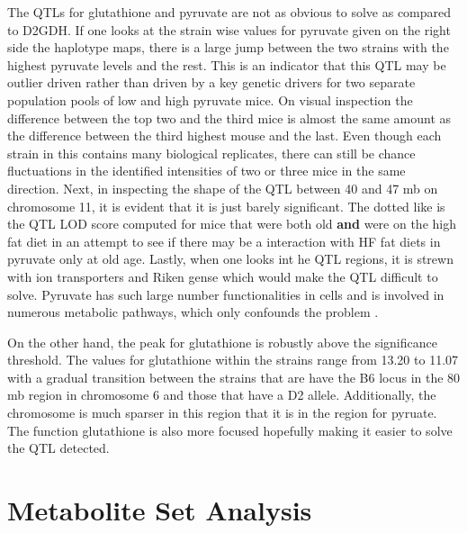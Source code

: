 \documentclass[a4paper]{book}
\begin{document}
	The QTLs for glutathione and pyruvate are not as obvious to solve as compared to D2GDH. If one looks at the strain wise values for pyruvate given on the right side the haplotype maps, there is a large jump between the two strains with the highest pyruvate  levels and the rest. This is an indicator that this QTL may be outlier driven rather than driven by a key genetic drivers for two separate population pools of low and high pyruvate mice. On visual inspection the difference between the top two and the third mice is almost the same amount as the difference between the third highest mouse and the last. Even though each strain in this contains many biological replicates, there can still be chance fluctuations in the identified intensities of two or three mice in the same direction. Next, in inspecting the shape of the QTL between 40 and 47 mb on chromosome 11, it is evident that it is just barely significant. The dotted like is the QTL LOD score computed for mice that were both old \textbf{and} were on the high fat diet in an attempt to see if there may be a interaction with HF fat diets in pyruvate only at old age. Lastly, when one looks int he QTL regions, it is strewn with ion transporters and Riken gense which would make the QTL difficult to solve. Pyruvate has such large number functionalities in cells and is involved in numerous metabolic pathways, which only confounds the problem \citep{Voet2011Biochemistry}.
	
	On the other hand, the peak for glutathione is robustly above the significance threshold. The values for glutathione within the strains range from 13.20 to 11.07 with a gradual transition between the strains that are have the B6 locus in the 80 mb region in chromosome 6 and those that have a D2 allele. Additionally, the chromosome is much sparser in this region that it is in the region for pyruate. The function glutathione is also more focused hopefully making it easier to solve the QTL detected.
	
	
	\section{Metabolite Set Analysis}
	
\end{document}
